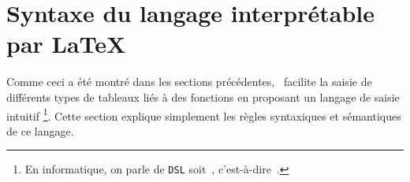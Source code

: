 \documentclass[10pt, a4paper]{article}
\begin{document}
\section{Syntaxe du langage interprétable par \LaTeX}

Comme ceci a été montré dans les sections précédentes, \thispack\ facilite la saisie de différents types de tableaux liés à des fonctions en proposant un langage de saisie intuitif
\footnote{
    En informatique, on parle de \texttt{DSL} soit \,, c'est-à-dire  \,.
}.
Cette section explique simplement les règles syntaxiques et sémantiques de ce langage.
\end{document}
